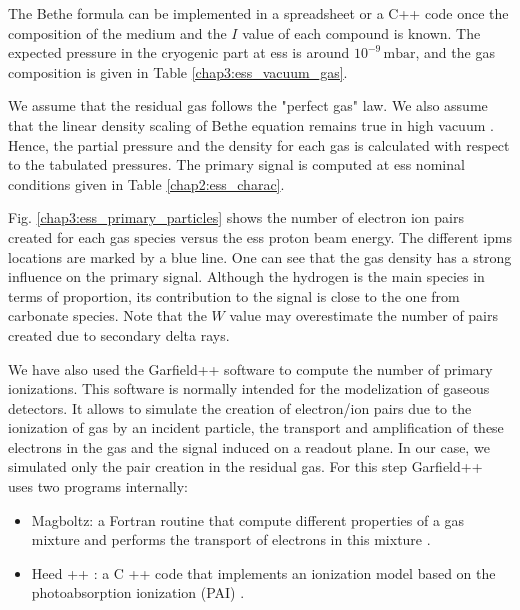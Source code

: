 \begin{refsection}
  The Bethe formula can be implemented in a spreadsheet or a C++ code once the composition of the medium and the \(I\) value of each compound is known. The expected pressure in the cryogenic part at \acrshort{ess} is around \(10^{-9}\,\mathrm{mbar}\), and the gas composition is given in Table \ref{chap3:ess_vacuum_gas}.

  

  We assume that the residual gas follows the "perfect gas" law. We also assume that the linear density scaling of Bethe equation remains true in high vacuum \cite[p. 108]{egber2012}\cite{Ishimaru1995}. Hence, the partial pressure and the density for each gas is calculated with respect to the tabulated pressures. The primary signal is computed at \acrshort{ess} nominal conditions given in Table \ref{chap2:ess_charac}.

  Fig. \ref{chap3:ess_primary_particles} shows the number of electron ion pairs created for each gas species versus the \acrshort{ess} proton beam energy. The different \acrshort{ipm}s locations are marked by a blue line. One can see that the gas density has a strong influence on the primary signal. Although the hydrogen is the main species in terms of proportion, its contribution to the signal is close to the one from carbonate species. Note that the \(W\) value may overestimate the number of pairs created due to secondary delta rays.

  

  We have also used the Garfield++ software to compute the number of primary  ionizations. This software is normally intended for the modelization of gaseous detectors. It allows to simulate the creation of electron/ion pairs due to the ionization of gas by an incident particle, the transport and amplification of these electrons in the gas and the signal induced on a readout plane. In our case, we simulated only the pair creation in the residual gas. For this step Garfield++ uses two programs internally:
  \begin{itemize}
    \item Magboltz: a Fortran routine that compute different properties of a gas mixture and performs the transport of electrons in this mixture \cite{Biagi1989}.
    \item Heed ++ \cite{Smirnov2005}: a C ++ code that implements an ionization model based on the photoabsorption ionization (PAI) \cite{Allison1980}.
  \end{itemize}


\end{refsection}
